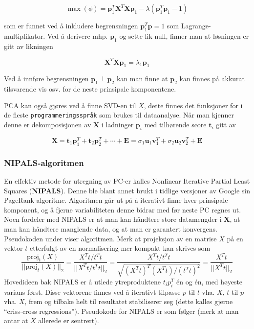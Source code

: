 \begin{equation}
	\max (\phi)=\boldsymbol{p}_{1}^{T} \boldsymbol{X}^{T} \boldsymbol{X} \boldsymbol{p}_{1}-\lambda\left(\boldsymbol{p}_{1}^{T} \boldsymbol{p}_{1}-1\right)
\end{equation}

som er funnet ved å inkludere begrensningen $\mathbf{p}_1^T \mathbf{p} = 1$ som Lagrange-multiplikator. Ved å derivere mhp. $\mathbf{p}_1$ og sette lik null, finner man at løsningen er gitt av likningen

\begin{equation}
	\mathbf{X}^T \mathbf{X} \mathbf{p}_1 = \lambda_1 \mathbf{p}_1
\end{equation}

Ved å innføre begrensningen $\mathbf{p}_1 \perp \mathbf{p}_2$ kan man finne at $\mathbf{p}_2$ kan finnes på akkurat tilsvarende vis osv. for de neste prinsipale komponentene.

PCA kan også gjøres ved å finne SVD-en til $X$, dette finnes det funksjoner for i de fleste \texttt{programmeringsspråk} som brukes til dataanalyse. Når man kjenner denne er dekomposisjonen av $\mathbf{X}$ i ladninger $\mathbf{p}_i$ med tilhørende score $\mathbf{t}_i$ gitt av

\begin{equation}
	\mathbf{X} = \mathbf{t}_1 \mathbf{p}_1^T + \mathbf{t}_2 \mathbf{p}_2^T + \cdots + \mathbf{E} = \sigma_1 \mathbf{u}_1 \mathbf{v}_1^T +  \sigma_2 \mathbf{u}_2 \mathbf{v}_2^T + \mathbf{E} 
\end{equation}


\subsubsection{NIPALS-algoritmen}
En effektiv metode for utregning av PC-er kalles Nonlinear Iterative Partial Least Squares (\textbf{NIPALS}). Denne ble blant annet brukt i tidlige versjoner av Google sin PageRank-algoritme. Algoritmen går ut på å iterativt finne hver prinsipale komponent, og å fjerne variabiliteten denne bidrar med før neste PC regnes ut. Noen fordeler med NIPALS er at man kan håndtere store datamengder i $\mathbf{X}$, at man kan håndtere manglende data, og at man er garantert konvergens. Pseudokoden under viser algoritmen. Merk at projeksjon av en matrise $X$ på en vektor $t$ etterfulgt av en normalisering mer kompakt kan skrives som 
\begin{equation}\frac{\textrm{proj}_t(X)}{|| \textrm{proj}_t(X) ||_2} = \frac{X^T t / t^T t}{|| X^T t / t^T t ||_2} = \frac{X^T t / t^T t}{\sqrt{(X^T t)^T (X^T t) / (t^T t)^2}} = \frac{X^T t}{|| X^T t ||_2}
\label{eq:normalisering_triks}
\end{equation}
Hovedideen bak NIPALS er å utlede ytreproduktene $t_i p_i^T$ én og én, med høyeste varians først. Disse vektorene finnes ved å iterativt tilpasse $p$ til $t$ vha. $X$, $t$ til $p$ vha. $X$, frem og tilbake helt til resultatet stabiliserer seg (dette kalles gjerne ``criss-cross regressions''). Pseudokode for NIPALS er som følger (merk at man antar at $X$ allerede er sentrert).

